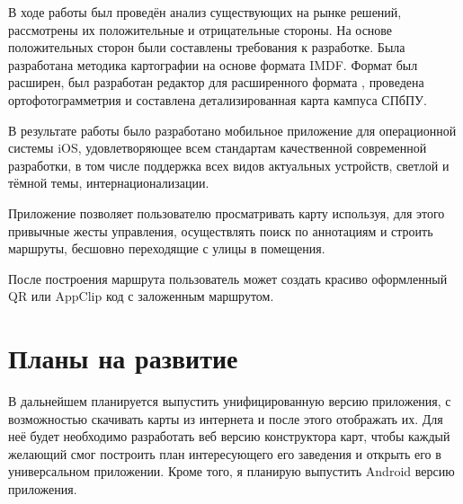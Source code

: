 В ходе работы был проведён анализ существующих на рынке решений, рассмотрены их положительные и отрицательные стороны. На основе положительных сторон были составлены требования к разработке. Была разработана методика картографии на основе формата IMDF. Формат был расширен, был разработан редактор для расширенного формата , проведена ортофотограмметрия  и составлена детализированная карта кампуса СПбПУ.

В результате работы было разработано мобильное приложение для операционной системы iOS, удовлетворяющее всем стандартам качественной современной разработки, в том числе поддержка всех видов актуальных устройств, светлой и тёмной темы, интернационализации.

Приложение позволяет пользователю просматривать карту используя, для этого привычные жесты управления, осуществлять поиск по аннотациям и строить маршруты, бесшовно переходящие с улицы в помещения.

После построения маршрута пользователь может создать красиво оформленный QR или AppClip код с заложенным маршрутом.


\section*{Планы на развитие}
  В дальнейшем планируется выпустить унифицированную версию приложения, с возможностью скачивать карты из интернета и после этого отображать их. Для неё будет необходимо разработать веб версию конструктора карт, чтобы каждый желающий смог построить план интересующего его заведения и открыть его в универсальном приложении. Кроме того, я планирую выпустить Android версию приложения.
